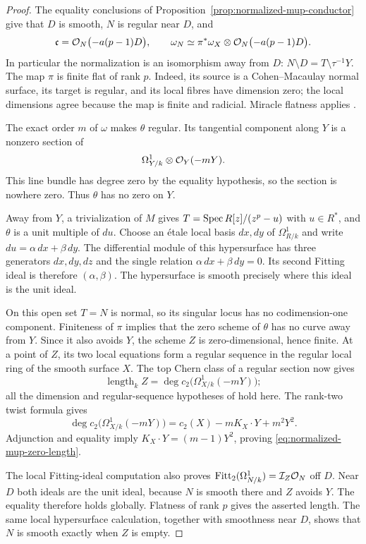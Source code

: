 \begin{proof}
The equality conclusions of
Proposition~\ref{prop:normalized-mup-conductor} give that $D$ is
smooth, $N$ is regular near $D$, and
\[
 \mathfrak c=\mathcal O_N\bigl(-a(p-1)D\bigr),\qquad
 \omega_N\simeq\pi^*\omega_X\otimes
                \mathcal O_N\bigl(-a(p-1)D\bigr).
\]
In particular the normalization is an isomorphism away from $D$:
$N\setminus D=T\setminus\tau^{-1}Y$. The map $\pi$ is finite flat
of rank $p$. Indeed, its source is a Cohen--Macaulay normal surface,
its target is regular, and its local fibres have dimension zero;
the local dimensions agree because the map is finite and radicial.
Miracle flatness applies \cite[Tag 00R4]{Stacks}.

The exact order $m$ of $\omega$ makes $\theta$ regular. Its
tangential component along $Y$ is a nonzero section of
\[
 \Omega^1_{Y/k}\otimes\mathcal O_Y(-mY).
\]
This line bundle has degree zero by the equality hypothesis, so the
section is nowhere zero. Thus $\theta$ has no zero on $Y$.

Away from $Y$, a trivialization of $M$ gives
$T=\operatorname{Spec} R[z]/(z^p-u)$ with $u\in R^*$, and $\theta$ is a unit
multiple of $du$. Choose an \'etale local basis $dx,dy$ of
$\Omega^1_{R/k}$ and write $du=\alpha\,dx+\beta\,dy$.
The differential module of this hypersurface has three generators
$dx,dy,dz$ and the single relation
$\alpha\,dx+\beta\,dy=0$. Its second Fitting ideal is therefore
$(\alpha,\beta)$. The hypersurface is smooth precisely where this
ideal is the unit ideal.

On this open set $T=N$ is normal, so its singular locus has no
codimension-one component. Finiteness of $\pi$ implies that the
zero scheme of $\theta$ has no curve away from $Y$. Since it also
avoids $Y$, the scheme $Z$ is zero-dimensional, hence finite. At a
point of $Z$, its two local equations form a regular sequence in
the regular local ring of the smooth surface $X$. The top Chern
class of a regular section now gives
\[
 \operatorname{length}_k Z
 =\deg c_2\bigl(\Omega^1_{X/k}(-mY)\bigr);
\]
all the dimension and regular-sequence hypotheses of
\cite[Tag 0FA9]{Stacks} hold here. The rank-two twist formula
\cite[Tag 02UD]{Stacks} gives
\[
 \deg c_2\bigl(\Omega^1_{X/k}(-mY)\bigr)
 =c_2(X)-mK_X\cdot Y+m^2Y^2.
\]
Adjunction and equality imply $K_X\cdot Y=(m-1)Y^2$, proving
\eqref{eq:normalized-mup-zero-length}.

The local Fitting-ideal computation also proves
$\operatorname{Fitt}_2(\Omega^1_{N/k})=\mathcal I_Z\mathcal O_N$
off $D$. Near $D$ both ideals are the unit ideal, because $N$ is
smooth there and $Z$ avoids $Y$. The equality therefore holds
globally. Flatness of rank $p$ gives the asserted length. The same
local hypersurface calculation, together with smoothness near $D$,
shows that $N$ is smooth exactly when $Z$ is empty.


\end{proof}
